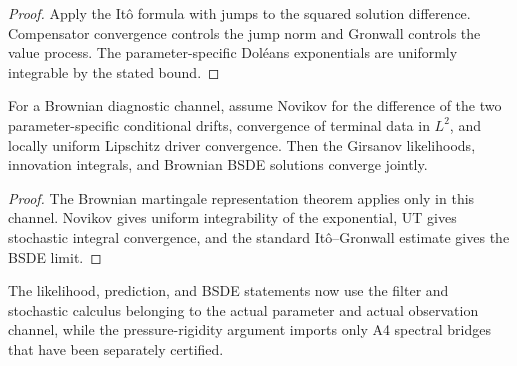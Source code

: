\begin{proof}
Apply the It\^o formula with jumps to the squared solution difference.
Compensator convergence controls the jump norm and Gronwall controls the value
process.  The parameter-specific Dol\'eans exponentials are uniformly
integrable by the stated bound.
\end{proof}

\begin{theorem}
\label{thm:r31-c2-brownian-bsde}
For a Brownian diagnostic channel, assume Novikov for the difference of the
two parameter-specific conditional drifts, convergence of terminal data in
$L^2$, and locally uniform Lipschitz driver convergence.  Then the Girsanov
likelihoods, innovation integrals, and Brownian BSDE solutions converge
jointly.
\end{theorem}

\begin{proof}
The Brownian martingale representation theorem applies only in this channel.
Novikov gives uniform integrability of the exponential, UT gives stochastic
integral convergence, and the standard It\^o--Gronwall estimate gives the BSDE
limit.
\end{proof}

The likelihood, prediction, and BSDE statements now use the filter and
stochastic calculus belonging to the actual parameter and actual observation
channel, while the pressure-rigidity argument imports only A4 spectral bridges
that have been separately certified.

